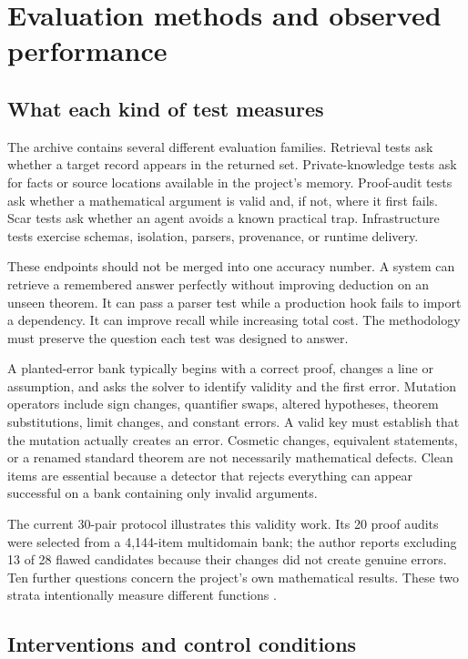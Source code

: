 \section{Evaluation methods and observed performance}
\label{sec:eval}

\subsection{What each kind of test measures}

The archive contains several different evaluation families. Retrieval tests ask whether a target record appears in the returned set. Private-knowledge tests ask for facts or source locations available in the project's memory. Proof-audit tests ask whether a mathematical argument is valid and, if not, where it first fails. Scar tests ask whether an agent avoids a known practical trap. Infrastructure tests exercise schemas, isolation, parsers, provenance, or runtime delivery.

These endpoints should not be merged into one accuracy number. A system can retrieve a remembered answer perfectly without improving deduction on an unseen theorem. It can pass a parser test while a production hook fails to import a dependency. It can improve recall while increasing total cost. The methodology must preserve the question each test was designed to answer.

A planted-error bank typically begins with a correct proof, changes a line or assumption, and asks the solver to identify validity and the first error. Mutation operators include sign changes, quantifier swaps, altered hypotheses, theorem substitutions, limit changes, and constant errors. A valid key must establish that the mutation actually creates an error. Cosmetic changes, equivalent statements, or a renamed standard theorem are not necessarily mathematical defects. Clean items are essential because a detector that rejects everything can appear successful on a bank containing only invalid arguments.

The current 30-pair protocol illustrates this validity work. Its 20 proof audits were selected from a 4,144-item multidomain bank; the author reports excluding 13 of 28 flawed candidates because their changes did not create genuine errors. Ten further questions concern the project's own mathematical results. These two strata intentionally measure different functions \citep{ab30prereg}.

\subsection{Interventions and control conditions}

